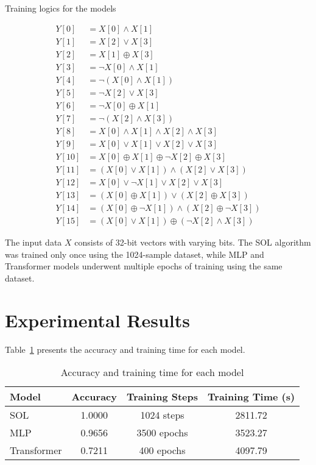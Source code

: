 \documentclass[11pt]{article}
\begin{document}
\begin{table}[H]
\centering
\caption{Training logics for the models}
\label{fig:logics}
\begin{align*}
Y[0] &= X[0] \land X[1] \\
Y[1] &= X[2] \lor X[3] \\
Y[2] &= X[1] \oplus X[3] \\
Y[3] &= \lnot X[0] \land X[1] \\
Y[4] &= \lnot(X[0] \land X[1]) \\
Y[5] &= \lnot X[2] \lor X[3] \\
Y[6] &= \lnot X[0] \oplus X[1] \\
Y[7] &= \lnot(X[2] \land X[3]) \\
Y[8] &= X[0] \land X[1] \land X[2] \land X[3] \\
Y[9] &= X[0] \lor X[1] \lor X[2] \lor X[3] \\
Y[10] &= X[0] \oplus X[1] \oplus \lnot X[2] \oplus X[3] \\
Y[11] &= (X[0] \lor X[1]) \land (X[2] \lor X[3]) \\
Y[12] &= X[0] \lor \lnot X[1] \lor X[2] \lor X[3] \\
Y[13] &= (X[0] \oplus X[1]) \lor (X[2] \oplus X[3]) \\
Y[14] &= (X[0] \oplus \lnot X[1]) \land (X[2] \oplus \lnot X[3]) \\
Y[15] &= (X[0] \lor X[1]) \oplus (\lnot X[2] \land X[3])
\end{align*}
\end{table}

The input data $X$ consists of 32-bit vectors with varying bits. The SOL algorithm was trained only once using the 1024-sample dataset, while MLP and Transformer models underwent multiple epochs of training using the same dataset.

\section{Experimental Results}
Table~\ref{tab:accuracy} presents the accuracy and training time for each model.

\begin{table}[H]
\centering
\caption{Accuracy and training time for each model}
\label{tab:accuracy}
\begin{tabular}{lccc}
\toprule
\textbf{Model} & \textbf{Accuracy} & \textbf{Training Steps} & \textbf{Training Time (s)} \\
\midrule
SOL         & 1.0000 & 1024 steps      & 2811.72 \\
MLP         & 0.9656 & 3500 epochs  & 3523.27 \\
Transformer & 0.7211 & 400 epochs   & 4097.79 \\
\bottomrule
\end{tabular}
\end{table}
\end{document}
